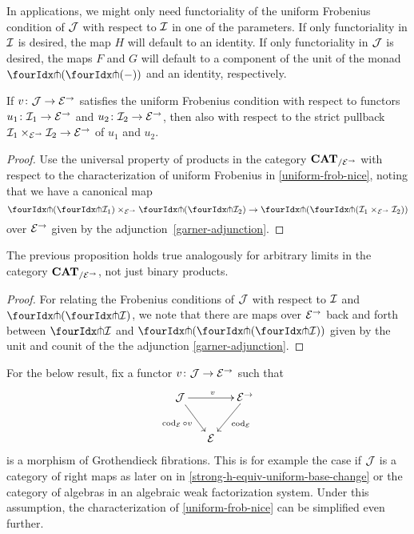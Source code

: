 \documentclass[reqno,10pt,a4paper,oneside,draft]{amsart}
\begin{document}
 In applications, we might only need functoriality of the uniform Frobenius condition of $\cal{J}$ with respect to $\cal{I}$ in one of the parameters.
If only functoriality in $\cal{I}$ is desired, the map $H$ will default to an identity.
If only functoriality in $\cal{J}$ is desired, the maps $F$ and $G$ will default to a component of the unit of the monad $\liftl{(\liftr{(-)})}$ and an identity, respectively.

\begin{proposition} \label{uniform-frobenius-product-u}
If $v \co \cal{J} \to \cal{E}^\to$ satisfies the uniform Frobenius condition with respect to functors $u_1 \co \cal{I}_1 \to \cal{E}^\to$ and $u_2 \co \cal{I}_2 \to \cal{E}^\to$, then also with respect to the strict pullback $\cal{I}_1 \times_{\cal{E}^\to} \cal{I}_2 \to \cal{E}^\to$ of $u_1$ and $u_2$.
\end{proposition}

\begin{proof}
Use the universal property of products in the category $\CAT_{/\cal{E}^\to}$ with respect to the characterization of uniform Frobenius in \cref{uniform-frob-nice}, noting that we have a canonical map
\[
\liftl{(\liftr{\cal{I}_1})} \times_{\cal{E}^\to} \liftl{(\liftr{\cal{I}_2})} \to \liftl{(\liftr{(\cal{I}_1 \times_{\cal{E}^\to} \cal{I}_2)})}
\]
over $\cal{E}^\to$ given by the adjunction~\eqref{garner-adjunction}.
\end{proof}

\begin{remark} \label{uniform-frobenius-limit-u}
The previous proposition holds true analogously for arbitrary limits in the category $\CAT_{/\cal{E}^\to}$, not just binary products.
\end{remark}

\begin{proof}
For relating the Frobenius conditions of $\cal{J}$ with respect to $\cal{I}$ and $\liftl{(\liftr{\cal{I}})}$, we note that there are maps over $\cal{E}^\to$ back and forth between $\liftr{\cal{I}}$ and $\liftr{(\liftl{(\liftr{\cal{I}})})}$ given by the unit and counit of the the adjunction \eqref{garner-adjunction}.

\end{proof}

For the below result, fix a functor $v \co \cal{J} \to \cal{E}^\to$ such that
\begin{equation} \label{uniform-frob:comprehension}
\begin{gathered}
\xymatrix@C-1em{
  \cal{J}
  \ar[rr]^{v}
  \ar[dr]_{\cod_{\cal{E}} \cc v}
&&
  \cal{E}^\to
  \ar[dl]^{\cod_{\cal{E}}}
\\&
  \cal{E}
}
\end{gathered}
\end{equation}
is a morphism of Grothendieck fibrations.
This is for example the case if $\cal{J}$ is a category of right maps as later on in \cref{strong-h-equiv-uniform-base-change} or the category of algebras in an algebraic weak factorization system.
Under this assumption, the characterization of \cref{uniform-frob-nice} can be simplified even further.
\end{document}
